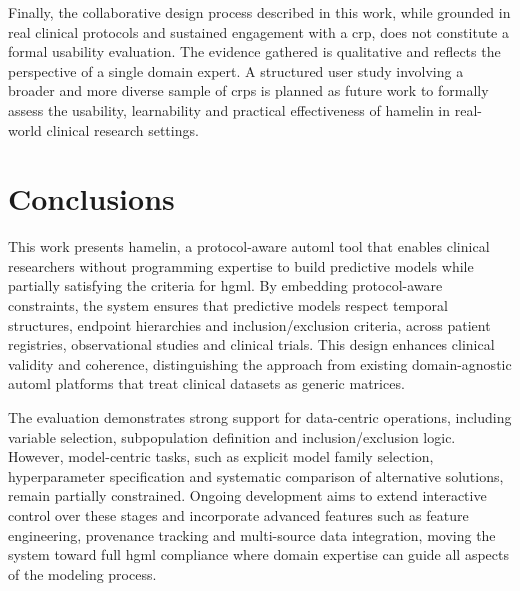 \documentclass[conference,twocolumn]{IEEEtran}
\begin{document}
Finally, the collaborative design process described in this work, while grounded in 
real clinical protocols and sustained engagement with a \gls{crp}, does not 
constitute a formal usability evaluation. The evidence gathered is qualitative and 
reflects the perspective of a single domain expert. A structured user study involving a broader and more diverse sample of \glspl{crp} is planned as future work to formally assess the usability, learnability and practical effectiveness of \gls{hamelin} in real-world clinical research settings.


\section{Conclusions}  
\label{sec:conclusions}

This work presents \gls{hamelin}, a protocol-aware \gls{automl} tool that enables clinical researchers without programming expertise to build predictive models while partially satisfying the criteria for \gls{hgml}. By embedding protocol-aware constraints, the system ensures that predictive models respect temporal structures, endpoint hierarchies and inclusion/exclusion criteria, across patient registries, observational studies and clinical trials. This design enhances clinical validity and coherence, distinguishing the approach from existing domain-agnostic \gls{automl} platforms that treat clinical datasets as generic matrices.

The evaluation demonstrates strong support for data-centric operations, including variable selection, subpopulation definition and inclusion/exclusion logic. However, model-centric tasks, such as explicit model family selection, hyperparameter specification and systematic comparison of alternative solutions, remain partially constrained. Ongoing development aims to extend interactive control over these stages and incorporate advanced features such as feature engineering, provenance tracking and multi-source data integration, moving the system toward full \gls{hgml} compliance where domain expertise can guide all aspects of the modeling process.





\end{document}
